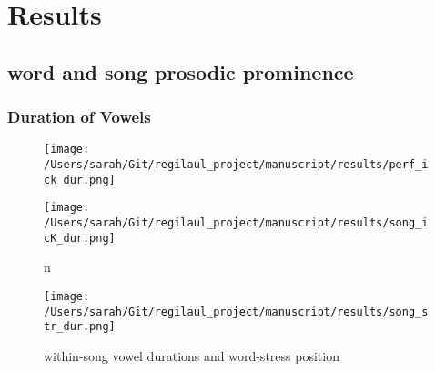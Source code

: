 \chapter{Results}
%


\section{word and song prosodic prominence}


\subsection{Duration of Vowels}

%
\begin{figure}[htb]
\begin{center}
\texttt{[image: /Users/sarah/Git/regilaul\_project/manuscript/results/perf\_ick\_dur.png]}

\caption{}
\label{songick}
\end{center}
\end{figure}
%
%
\begin{figure}[htb]
\begin{center}
\texttt{[image: /Users/sarah/Git/regilaul\_project/manuscript/results/song\_icK\_dur.png]}

\caption{n}
\label{songstr}
\end{center}
\end{figure}

\begin{figure}[htb]
\begin{center}
\texttt{[image: /Users/sarah/Git/regilaul\_project/manuscript/results/song\_str\_dur.png]}

\caption{within-song vowel durations and word-stress position}
\label{songstr}
\end{center}
\end{figure}

%
%

